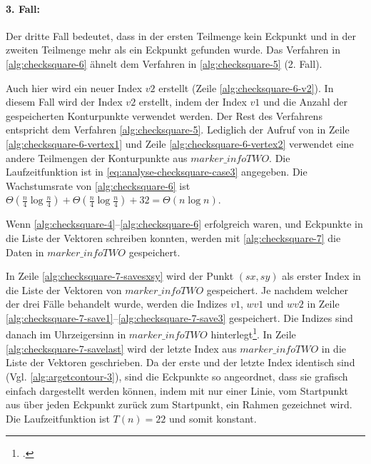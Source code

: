 \paragraph{3. Fall:} %
\label{par:3_fall}
Der dritte Fall bedeutet, dass in der ersten Teilmenge kein Eckpunkt und in der zweiten Teilmenge mehr als ein Eckpunkt
 gefunden wurde. Das Verfahren in \autoref{alg:checksquare-6} ähnelt dem Verfahren in \autoref{alg:checksquare-5}
 (2. Fall).

 Auch hier wird ein neuer Index $\mathit{v2}$ erstellt (Zeile \ref{alg:checksquare-6-v2}). In diesem Fall wird der
 Index $\mathit{v2}$ erstellt, indem der Index $\mathit{v1}$ und die Anzahl der gespeicherten Konturpunkte verwendet
 werden. Der Rest des Verfahrens entspricht dem Verfahren \autoref{alg:checksquare-5}. Lediglich der Aufruf von
  in Zeile \ref{alg:checksquare-6-vertex1} und Zeile \ref{alg:checksquare-6-vertex2} verwendet
 eine andere Teilmengen der Konturpunkte aus $\mathit{marker\_infoTWO}$. Die Laufzeitfunktion ist in
 \autoref{eq:analyse-checksquare-case3} angegeben. Die Wachstumsrate von \autoref{alg:checksquare-6} ist
 $\Theta(\tfrac{n}{4} \log \tfrac{n}{4}) + \Theta(\tfrac{n}{4} \log \tfrac{n}{4}) + 32 = \Theta(n \log n)$.


Wenn \autoref{alg:checksquare-4}--\autoref{alg:checksquare-6} erfolgreich waren, und Eckpunkte in die Liste der
 Vektoren schreiben konnten, werden mit \autoref{alg:checksquare-7} die Daten in $\mathit{marker\_infoTWO}$
 gespeichert.

In Zeile \ref{alg:checksquare-7-savesxsy} wird der Punkt $(\mathit{sx},\mathit{sy})$ als erster Index in die Liste der
 Vektoren von $\mathit{marker\_infoTWO}$ gespeichert. Je nachdem welcher der drei Fälle behandelt wurde, werden die
 Indizes $\mathit{v1}$, $\mathit{wv1}$ und $\mathit{wv2}$ in Zeile
 \ref{alg:checksquare-7-save1}--\ref{alg:checksquare-7-save3} gespeichert. Die Indizes sind danach im Uhrzeigersinn in
 $\mathit{marker\_infoTWO}$ hinterlegt\footcite[Vgl.][S.~44]{wagner07a}. In Zeile \ref{alg:checksquare-7-savelast} wird
 der letzte Index aus $\mathit{marker\_infoTWO}$ in die Liste der Vektoren geschrieben. Da der erste und der letzte
 Index identisch sind (Vgl. \autoref{alg:argetcontour-3}), sind die Eckpunkte so angeordnet, dass sie grafisch einfach
 dargestellt werden können, indem mit nur einer Linie, vom Startpunkt aus über jeden Eckpunkt zurück zum Startpunkt,
 ein Rahmen gezeichnet wird. Die Laufzeitfunktion ist $T(n) = 22$ und somit konstant.

